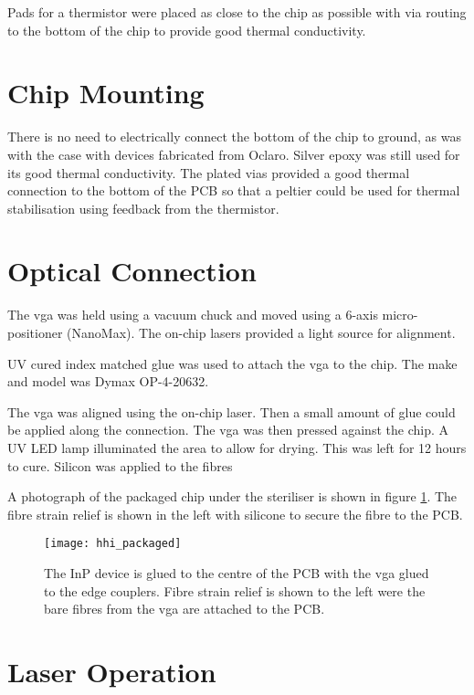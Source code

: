 Pads for a thermistor were placed as close to the chip as possible with via routing to the bottom of the chip to provide good thermal conductivity.

\section{Chip Mounting}

There is no need to electrically connect the bottom of the chip to ground, as was with the case with devices fabricated from Oclaro. Silver epoxy was still used for its good thermal conductivity. The plated vias provided a good thermal connection to the bottom of the PCB so that a peltier could be used for thermal stabilisation using feedback from the thermistor.

\section{Optical Connection}

The \ac{vga} was held using a vacuum chuck and moved using a 6-axis micro-positioner (NanoMax). The on-chip lasers provided a light source for alignment. 

UV cured index matched glue was used to attach the \ac{vga} to the chip. The make and model was Dymax OP-4-20632.

The \ac{vga} was aligned using the on-chip laser. Then a small amount of glue could be applied along the connection. The \ac{vga} was then pressed against the chip. A UV LED lamp illuminated the area to allow for drying. This was left for 12 hours to cure. Silicon was applied to the fibres 

A photograph of the packaged chip under the steriliser is shown in figure \ref{fig:hhi_photo}. The fibre strain relief is shown in the left with silicone to secure the fibre to the PCB. 

\begin{figure}
	\centering
	\texttt{[image: hhi\_packaged]}
	\caption[Photograph of packaged HHI transmitter]{The \ac{InP} device is glued to the centre of the PCB with the \ac{vga} glued to the edge couplers. Fibre strain relief is shown to the left were the bare fibres from the \ac{vga} are attached to the PCB.}
	\label{fig:hhi_photo}
\end{figure}

\section{Laser Operation}

